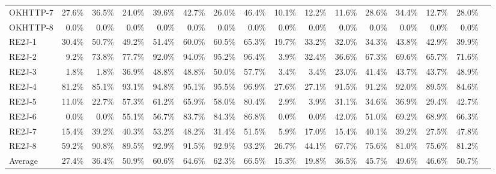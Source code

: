 \begin{tabular}{ l rrrrrrr rrrrrrrr}
OKHTTP-7 & 27.6\% & 36.5\% & 24.0\% & 39.6\% & 42.7\% & 26.0\% & 46.4\% & 10.1\% & 12.2\% & 11.6\% & 28.6\% & 34.4\% & 12.7\% & 28.0\%\\ 
OKHTTP-8 & \cellcolor{light-gray} \textcolor{black}{0.0}\% & \cellcolor{light-gray} \textcolor{black}{0.0}\% & \cellcolor{light-gray} \textcolor{black}{0.0}\% & \cellcolor{light-gray} \textcolor{black}{0.0}\% & \cellcolor{light-gray} \textcolor{black}{0.0}\% & \cellcolor{light-gray} \textcolor{black}{0.0}\% & \cellcolor{light-gray} \textcolor{black}{0.0}\% & \cellcolor{light-gray} \textcolor{black}{0.0}\% & \cellcolor{light-gray} \textcolor{black}{0.0}\% & \cellcolor{light-gray} \textcolor{black}{0.0}\% & \cellcolor{light-gray} \textcolor{black}{0.0}\% & \cellcolor{light-gray} \textcolor{black}{0.0}\% & \cellcolor{light-gray} \textcolor{black}{0.0}\% & \cellcolor{light-gray} \textcolor{black}{0.0}\%\\ 
RE2J-1 & 30.4\% & 50.7\% & 49.2\% & 51.4\% & 60.0\% & 60.5\% & 65.3\% & 19.7\% & 33.2\% & 32.0\% & 34.3\% & 43.8\% & 42.9\% & 39.9\%\\ 
RE2J-2 & 9.2\% & 73.8\% & 77.7\% & 92.0\% & 94.0\% & 95.2\% & 96.4\% & 3.9\% & 32.4\% & 36.6\% & 67.3\% & 69.6\% & 65.7\% & 71.6\%\\ 
RE2J-3 & 1.8\% & 1.8\% & 36.9\% & 48.8\% & 48.8\% & 50.0\% & 57.7\% & 3.4\% & 3.4\% & 23.0\% & 41.4\% & 43.7\% & 43.7\% & 48.9\%\\ 
RE2J-4 & 81.2\% & 85.1\% & 93.1\% & 94.8\% & 95.1\% & 95.5\% & 96.9\% & 27.6\% & 27.1\% & 91.5\% & 91.2\% & 92.0\% & 89.5\% & 84.6\%\\ 
RE2J-5 & 11.0\% & 22.7\% & 57.3\% & 61.2\% & 65.9\% & 58.0\% & 80.4\% & 2.9\% & 3.9\% & 31.1\% & 34.6\% & 36.9\% & 29.4\% & 42.7\%\\ 
RE2J-6 & \cellcolor{light-gray} \textcolor{black}{0.0}\% & \cellcolor{light-gray} \textcolor{black}{0.0}\% & 55.1\% & 56.7\% & 83.7\% & 84.3\% & 86.8\% & \cellcolor{light-gray} \textcolor{black}{0.0}\% & \cellcolor{light-gray} \textcolor{black}{0.0}\% & 42.0\% & 51.0\% & 69.2\% & 68.9\% & 66.3\%\\ 
RE2J-7 & 15.4\% & 39.2\% & 40.3\% & 53.2\% & 48.2\% & 31.4\% & 51.5\% & 5.9\% & 17.0\% & 15.4\% & 40.1\% & 39.2\% & 27.5\% & 47.8\%\\ 
RE2J-8 & 59.2\% & 90.8\% & 89.5\% & 92.9\% & 91.5\% & 92.9\% & 93.2\% & 26.7\% & 44.1\% & 67.7\% & 75.6\% & 81.0\% & 75.6\% & 81.2\%\\ 
\midrule 
Average  &  27.4\% &  36.4\% &  50.9\% &  60.6\% &  64.6\% &  62.3\% &  66.5\% &  15.3\% &  19.8\% &  36.5\% &  45.7\% &  49.6\% &  46.6\% &  50.7\%\\ 
\bottomrule 
\end{tabular} 
